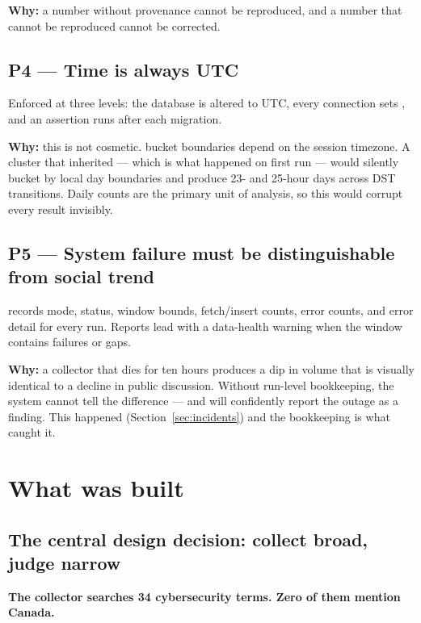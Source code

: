 \documentclass[11pt]{article}
\begin{document}
\textbf{Why:} a number without provenance cannot be reproduced, and a number
that cannot be reproduced cannot be corrected.

\subsection*{P4 --- Time is always UTC}
Enforced at three levels: the database is altered to UTC, every connection sets
, and an assertion runs after each migration.

\textbf{Why:} this is not cosmetic. 
bucket boundaries depend on the session timezone. A cluster that inherited
 --- which is what happened on first run --- would
silently bucket by local day boundaries and produce 23- and 25-hour days across
DST transitions. Daily counts are the primary unit of analysis, so this would
corrupt every result invisibly.

\subsection*{P5 --- System failure must be distinguishable from social trend}
 records mode, status, window bounds, fetch/insert
counts, error counts, and error detail for every run. Reports lead with a
data-health warning when the window contains failures or gaps.

\textbf{Why:} a collector that dies for ten hours produces a dip in volume that
is visually identical to a decline in public discussion. Without run-level
bookkeeping, the system cannot tell the difference --- and will confidently
report the outage as a finding. This happened (Section~\ref{sec:incidents}) and
the bookkeeping is what caught it.

\section{What was built}

\subsection{The central design decision: collect broad, judge narrow}
\label{sec:asymmetry}

\begin{keybox}
\textbf{The collector searches 34 cybersecurity terms. Zero of them mention
Canada.}
\end{keybox}
\end{document}
